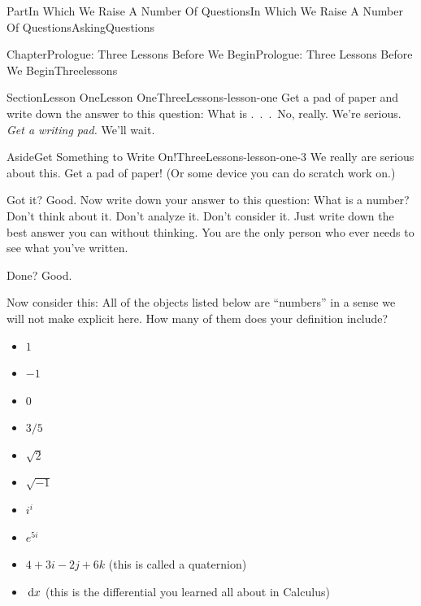 \documentclass[oneside,10pt,]{book}
\numberwithin{equation}{part}
\newcommand{\dx}[1]{\,{\rm d}#1}
\begin{document}
\begin{partptx}{Part}{In Which We Raise A Number Of Questions}{}{In Which We Raise A Number Of Questions}{}{}{AskingQuestions}
\renewcommand*{\partname}{Part}
%
%
\typeout{************************************************}
\typeout{************************************************}
%
\begin{chapterptx}{Chapter}{Prologue: Three Lessons Before We Begin}{}{Prologue: Three Lessons Before We Begin}{}{}{Threelessons}
\renewcommand*{\chaptername}{Chapter}
%
%
\typeout{************************************************}
\typeout{************************************************}
%
\begin{sectionptx}{Section}{Lesson One}{}{Lesson One}{}{}{ThreeLessons-lesson-one}
Get a pad of paper and write down the answer to this question: What is .~.~.~No, really.  We're serious. \emph{Get a writing pad.} We'll wait.%
\begin{aside}{Aside}{Get Something to Write On!}{ThreeLessons-lesson-one-3}%
We really are serious about this.  Get a pad of paper! (Or some device you can do scratch work on.)%
\end{aside}
Got it?  Good. Now write down your answer to this question: What is a number?  Don't think about it.  Don't analyze it. Don't consider it.  Just write down the best answer you can without thinking.  You are the only person who ever needs to see what you've written.%
\par
Done?  Good.%
\par
Now consider this: All of the objects listed below are ``numbers'' in a sense we will not make explicit here.  How many of them does your definition include?%
\par
%
\begin{itemize}[label=\textbullet]
\item{}\(\displaystyle 1\)%
\item{}\(\displaystyle -1\)%
\item{}\(\displaystyle 0\)%
\item{}\(\displaystyle 3/5\)%
\item{}\(\displaystyle \sqrt{2}\)%
\item{}\(\displaystyle \sqrt{-1}\)%
\item{}\(\displaystyle i^i\)%
\item{}\(\displaystyle e^{5i}\)%
\item{}\(4+3i-2j+6k\) (this is called a quaternion)%
\item{}\(\dx{x}\) (this is the differential you learned all about in Calculus)%

\end{itemize}
\end{sectionptx}
\end{chapterptx}
\end{partptx}
\end{document}
